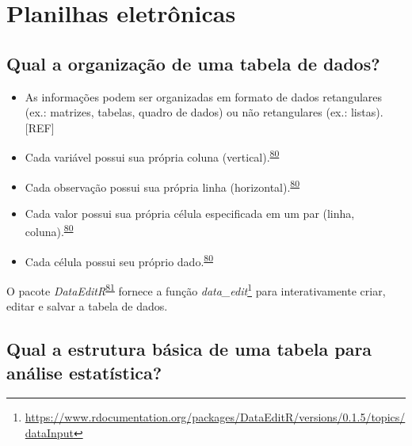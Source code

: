 \documentclass[
  a4paper,
]{book}
\renewcommand{\href}[2]{#2\footnote{\url{#1}}}
\newenvironment{infobox}[1]
  {
  \begin{itemize}
  \renewcommand{\labelitemi}{
    \raisebox{-.7\height}[0pt][0pt]{
      {\setkeys{Gin}{width=3em,keepaspectratio}
        \texttt{[image: \#1]}}
    }
  }
  \setlength{\fboxsep}{1em}
  \begin{blackbox}
  \item
  }
  {
  \end{blackbox}
  \end{itemize}
  }
\begin{document}
\hypertarget{planilhas}{%
\section{Planilhas eletrônicas}\label{planilhas}}

\hypertarget{qual-a-organizauxe7uxe3o-de-uma-tabela-de-dados}{%
\subsection{Qual a organização de uma tabela de dados?}\label{qual-a-organizauxe7uxe3o-de-uma-tabela-de-dados}}

\begin{itemize}
\item
  As informações podem ser organizadas em formato de dados retangulares (ex.: matrizes, tabelas, quadro de dados) ou não retangulares (ex.: listas).{[}REF{]}
\item
  Cada variável possui sua própria coluna (vertical).\textsuperscript{\protect\hyperlink{ref-tierney2023}{80}}
\item
  Cada observação possui sua própria linha (horizontal).\textsuperscript{\protect\hyperlink{ref-tierney2023}{80}}
\item
  Cada valor possui sua própria célula especificada em um par (linha, coluna).\textsuperscript{\protect\hyperlink{ref-tierney2023}{80}}
\item
  Cada célula possui seu próprio dado.\textsuperscript{\protect\hyperlink{ref-tierney2023}{80}}
\end{itemize}

\begin{infobox}{images/Rlogo}
O pacote \emph{DataEditR}\textsuperscript{\protect\hyperlink{ref-DataEditR}{81}} fornece a função \href{https://www.rdocumentation.org/packages/DataEditR/versions/0.1.5/topics/dataInput}{\emph{data\_edit}} para interativamente criar, editar e salvar a tabela de dados.

\end{infobox}

\hypertarget{qual-a-estrutura-buxe1sica-de-uma-tabela-para-anuxe1lise-estatuxedstica}{%
\subsection{Qual a estrutura básica de uma tabela para análise estatística?}\label{qual-a-estrutura-buxe1sica-de-uma-tabela-para-anuxe1lise-estatuxedstica}}
\end{document}

